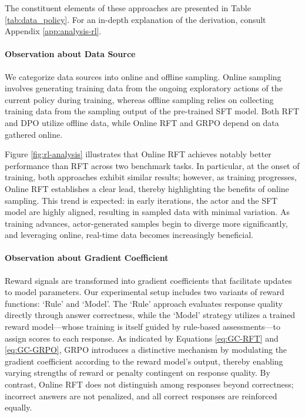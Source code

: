 The constituent elements of these approaches are presented in Table \ref{tab:data_policy}. For an in-depth explanation of the derivation, consult Appendix \ref{app:analysis-rl}.

\paragraph{Observation about Data Source} We categorize data sources into online and offline sampling. Online sampling involves generating training data from the ongoing exploratory actions of the current policy during training, whereas offline sampling relies on collecting training data from the sampling output of the pre-trained SFT model. Both RFT and DPO utilize offline data, while Online RFT and GRPO depend on data gathered online.

Figure \ref{fig:rl-analysis} illustrates that Online RFT achieves notably better performance than RFT across two benchmark tasks. In particular, at the onset of training, both approaches exhibit similar results; however, as training progresses, Online RFT establishes a clear lead, thereby highlighting the benefits of online sampling. This trend is expected: in early iterations, the actor and the SFT model are highly aligned, resulting in sampled data with minimal variation. As training advances, actor-generated samples begin to diverge more significantly, and leveraging online, real-time data becomes increasingly beneficial.

\paragraph{Observation about Gradient Coefficient} Reward signals are transformed into gradient coefficients that facilitate updates to model parameters. Our experimental setup includes two variants of reward functions: ‘Rule’ and ‘Model’. The ‘Rule’ approach evaluates response quality directly through answer correctness, while the ‘Model’ strategy utilizes a trained reward model—whose training is itself guided by rule-based assessments—to assign scores to each response. As indicated by Equations \ref{eq:GC-RFT} and \ref{eq:GC-GRPO}, GRPO introduces a distinctive mechanism by modulating the gradient coefficient according to the reward model’s output, thereby enabling varying strengths of reward or penalty contingent on response quality. By contrast, Online RFT does not distinguish among responses beyond correctness; incorrect answers are not penalized, and all correct responses are reinforced equally.

